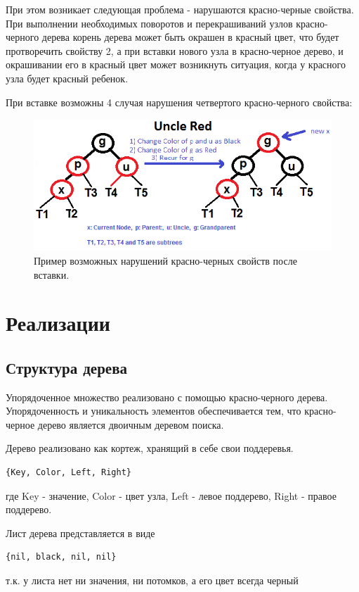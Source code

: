 		При этом возникает следующая проблема - нарушаются красно-черные свойства.
		При выполнении необходимых поворотов и перекрашиваний узлов красно-черного 
		дерева корень дерева может быть окрашен в красный цвет, что будет протворечить
		свойству 2, а при вставки нового узла в красно-черное дерево, и окрашивании
		его в красный цвет может возникнуть ситуация, когда у красного узла будет 
		красный ребенок.

		При вставке возможны 4 случая нарушения четвертого красно-черного свойства:
		\begin{figure}[H]
			\centering
			\includegraphics[width=\textwidth]{img/tan-aus.png}
			\caption{Пример возможных нарушений красно-черных свойств после вставки.}
		\end{figure}  


\section{Реализации}
	\subsection{Структура дерева}
		Упорядоченное множество реализовано с помощью красно-черного дерева. 
		Упорядоченность и уникальность элементов обеспечивается тем, 
		что красно-черное дерево является двоичным деревом поиска.

		Дерево реализовано как кортеж, хранящий в себе свои поддеревья.
		\begin{lstlisting}
{Key, Color, Left, Right}
		\end{lstlisting}
		где Key - значение, Color - цвет узла, Left - левое поддерево,
		Right - правое поддерево.

		Лист дерева представляется в виде 
		\begin{lstlisting}
{nil, black, nil, nil}
		\end{lstlisting}
		т.к. у листа нет ни значения, ни потомков, а его цвет всегда черный


